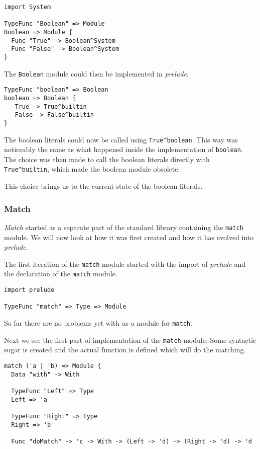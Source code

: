 \begin{lstlisting}
import System

TypeFunc "Boolean" => Module
Boolean => Module {
  Func "True" -> Boolean^System
  Func "False" -> Boolean^System
}
\end{lstlisting}

The \texttt{Boolean} module could then be implemented in \emph{prelude}.

\begin{lstlisting}
TypeFunc "boolean" => Boolean
boolean => Boolean {
   True -> True^builtin
   False -> False^builtin
}
\end{lstlisting}

The boolean literals could now be called using \texttt{True\^{}boolean}.
This way was noticeably the same as what happened inside the implementation of
\newline \texttt{boolean}.
The choice was then made to call the boolean literals directly with \texttt{True\^{}builtin}, which made the boolean module obsolete.

This choice brings us to the current state of the boolean literals.


\subsubsection{Match}
\emph{Match} started as a separate part of the standard library containing the \texttt{match} module.
We will now look at how it was first created and how it has evolved into \emph{prelude}.

The first iteration of the \texttt{match} module started with the import of \emph{prelude} and the declaration of the \texttt{match} module.

\begin{lstlisting}
import prelude

TypeFunc "match" => Type => Module
\end{lstlisting}

So far there are no problems yet with us a module for \texttt{match}.

Next we see the first part of implementation of the \texttt{match} module:
Some syntactic sugar is created and the actual function is defined which will do the matching.

\begin{lstlisting}
match ('a | 'b) => Module {
  Data "with" -> With

  TypeFunc "Left" => Type
  Left => 'a

  TypeFunc "Right" => Type
  Right => 'b

  Func "doMatch" -> 'c -> With -> (Left -> 'd) -> (Right -> 'd) -> 'd
\end{lstlisting}

